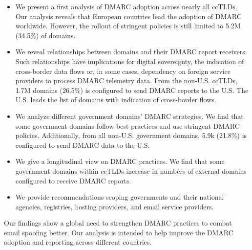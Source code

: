 \begin{itemize}
    \item We present a first analysis of \gls{DMARC} adoption across nearly all \glspl{ccTLD}. Our analysis reveals that European countries lead the adoption of \gls{DMARC} worldwide. However, the rollout of stringent policies is still limited to 5.2M (34.5\%) of domains.
    \item We reveal relationships between domains and their \gls{DMARC} report receivers. Such relationships have implications for digital sovereignty, \eg the indication of cross-border data flows or, in some cases, dependency on foreign service providers to process \gls{DMARC} telemetry data. From the non-U.S. \glspl{ccTLD}, 1.7M domains (26.5\%) is configured to send \gls{DMARC} reports to the U.S. The U.S. leads the list of domains with indication of cross-border flows.
    \item We analyze different government domains' \gls{DMARC} strategies. We find that some government domains follow best practices and use stringent \gls{DMARC} policies. Additionally, from all non-U.S. government domains, 5.9k (21.8\%) is configured to send \gls{DMARC} data to the U.S.
    \item We give a longitudinal view on \gls{DMARC} practices. We find that some government domains within \glspl{ccTLD} increase in numbers of external domains configured to receive \gls{DMARC} reports.
    \item We provide recommendations scoping governments and their national agencies, registries, hosting providers, and email service providers.
\end{itemize}

Our findings show a global need to strengthen \gls{DMARC} practices to combat email spoofing better.
Our analysis is intended to help improve the \gls{DMARC} adoption and reporting across different countries.
